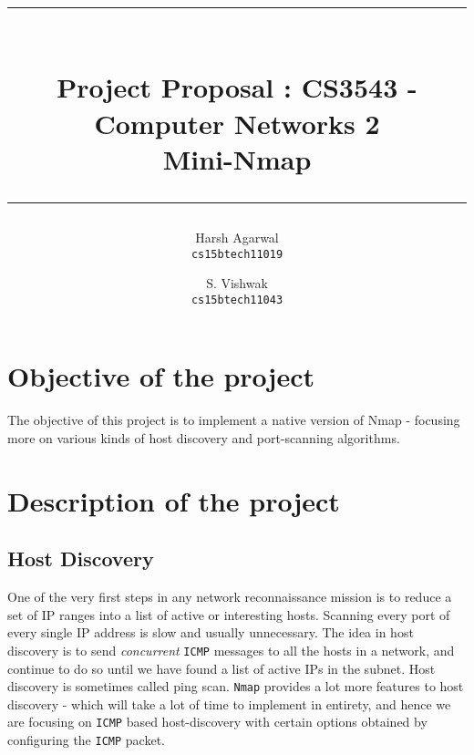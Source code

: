 \documentclass{article}
\title{\rule{\linewidth}{2pt}\\\vspace{2mm}
Project Proposal : CS3543 - Computer Networks 2\\
\textbf{Mini-Nmap}\\
\rule{\linewidth}{2pt}}
\author{Harsh Agarwal\\\texttt{cs15btech11019}
\and
S. Vishwak\\\texttt{cs15btech11043}}
\date{}
\begin{document}
\maketitle
\nocite{*}

\section{Objective of the project}
\begin{flushleft}
The objective of this project is to implement a native version of Nmap - focusing more on various kinds of host discovery and port-scanning algorithms.
\end{flushleft}

\section{Description of the project}
\subsection{Host Discovery}
\begin{flushleft}
One of the very first steps in any network reconnaissance mission is to reduce a set of IP ranges into a list of active or interesting hosts. Scanning every port of every single IP address is slow and usually unnecessary. The idea in host discovery is to send \emph{concurrent} \texttt{ICMP} messages to all the hosts in a network, and continue to do so until we have found a list of active IPs in the subnet. Host discovery is sometimes called ping scan. \texttt{Nmap} provides a lot more features to host discovery - which will take a lot of time to implement in entirety, and hence we are focusing on \texttt{ICMP} based host-discovery with certain options obtained by configuring the \texttt{ICMP} packet.
\end{flushleft}
\end{document}
